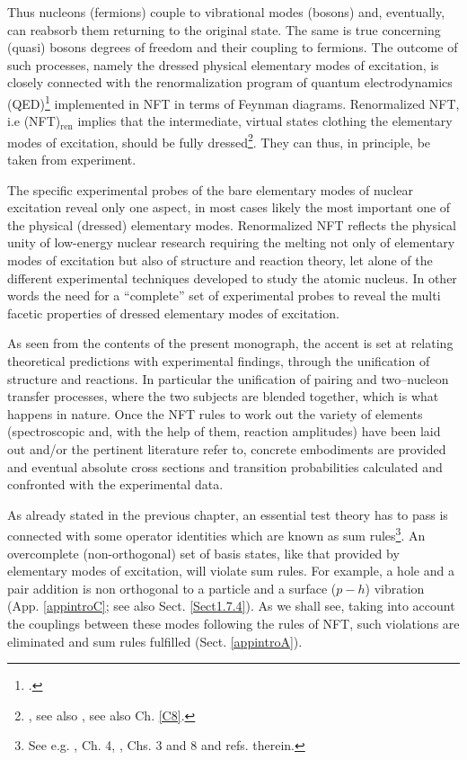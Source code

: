  
 Thus nucleons (fermions)  couple to  vibrational modes (bosons) and, eventually, can reabsorb them returning to the original state. The same is true concerning (quasi) bosons degrees of freedom and their coupling to fermions.  The outcome of such processes, namely the dressed physical elementary modes of excitation, is closely connected with the renormalization program of quantum electrodynamics (QED)\footnote{\cite{Feynman:75,Schwinger:01}.} implemented in NFT in terms of Feynman diagrams. Renormalized NFT, i.e (NFT)$_{\text{ren}}$ implies that the intermediate, virtual states clothing the elementary modes of excitation, should be fully dressed\footnote{\cite{Barranco:17}, see also \cite{Broglia:16}, see also Ch. \ref{C8}.}. They can thus, in principle, be taken from experiment. 
  
 
  The specific experimental probes of the bare elementary modes of nuclear excitation reveal only one aspect, in most cases likely the most important one of the physical (dressed) elementary modes. Renormalized NFT  reflects the physical unity of  low-energy nuclear research requiring the melting not only of elementary modes of excitation but also of structure and reaction theory, let alone of the different experimental techniques developed to study the atomic nucleus. In other words the need for a ``complete'' set of experimental probes to reveal the multi facetic properties of dressed elementary modes of excitation.

As  seen from the contents of the present monograph, the accent is set at relating theoretical predictions with experimental findings, through the unification of structure and reactions. In particular the unification of pairing and two--nucleon transfer processes, where the two subjects are blended together, which is what happens in nature.  Once the NFT rules to work out the variety of elements (spectroscopic and, with the help of them, reaction amplitudes) have been laid  out and/or the pertinent literature refer to, concrete embodiments are provided and eventual absolute cross sections and transition probabilities calculated and confronted with the experimental data. 


As already stated in the previous chapter, an essential test theory has to pass is connected  with some operator identities which are known as sum rules\footnote{See e.g. \cite{Bohr:75}, \cite{Bertsch:05} Ch. 4, \cite{Bortignon:98}, Chs. 3 and 8 and refs. therein.}. An overcomplete (non-orthogonal) set of basis states, like that provided by elementary modes of excitation, will violate sum rules. For example, a hole and a pair addition  is non orthogonal to a particle and a surface ($p-h$) vibration (App. \ref{appintroC}; see also Sect. \ref{Sect1.7.4}). As we shall see, taking into account the couplings between these modes following the rules of NFT,   such violations are eliminated and sum rules fulfilled (Sect. \ref{appintroA}).

